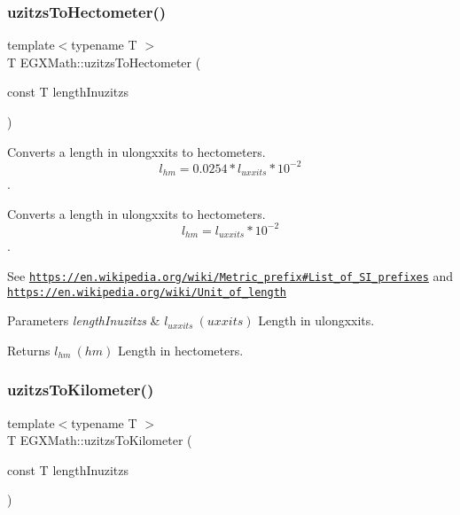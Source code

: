 \subsubsection{\texorpdfstring{uzitzs\+To\+Hectometer()}{uzitzsToHectometer()}}
{\footnotesize\ttfamily template$<$typename T $>$ \\
T E\+G\+X\+Math\+::uzitzs\+To\+Hectometer (\begin{DoxyParamCaption}\item[{const T}]{length\+Inuzitzs }\end{DoxyParamCaption})}



Converts a length in ulongxxits to hectometers. \[ l_{hm}=0.0254 * l_{uxxits} * 10^{-2} \]. 

Converts a length in ulongxxits to hectometers. \[ l_{hm}=l_{uxxits} * 10^{-2} \].

See \href{https://en.wikipedia.org/wiki/Metric_prefix#List_of_SI_prefixes}{\tt https\+://en.\+wikipedia.\+org/wiki/\+Metric\+\_\+prefix\#\+List\+\_\+of\+\_\+\+S\+I\+\_\+prefixes} and \href{https://en.wikipedia.org/wiki/Unit_of_length}{\tt https\+://en.\+wikipedia.\+org/wiki/\+Unit\+\_\+of\+\_\+length} 
\begin{DoxyParams}{Parameters}
{\em length\+Inuzitzs} & $ l_{uxxits}\ (uxxits)$ Length in ulongxxits. \\
\hline
\end{DoxyParams}
\begin{DoxyReturn}{Returns}
$ l_{hm}\ (hm)$ Length in hectometers. 
\end{DoxyReturn}
\mbox{\label{group___e_g_x_math-_conversions-_length_conversions-_imperial-uzitzs-_s_i_ga43a39eb66f3250c955de8fb2beff314c}} 
\subsubsection{\texorpdfstring{uzitzs\+To\+Kilometer()}{uzitzsToKilometer()}}
{\footnotesize\ttfamily template$<$typename T $>$ \\
T E\+G\+X\+Math\+::uzitzs\+To\+Kilometer (\begin{DoxyParamCaption}\item[{const T}]{length\+Inuzitzs }\end{DoxyParamCaption})}



